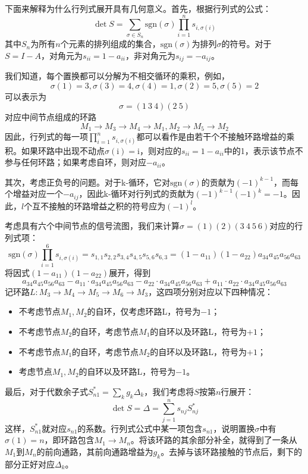 下面来解释为什么行列式展开具有几何意义。首先，根据行列式的公式：
\[\det S=\sum_{\sigma\in S_n}\text{sgn}(\sigma)\prod_{i=1}^{n}s_{i,\sigma(i)}\]
其中$S_n$为所有$n$个元素的排列组成的集合，$\text{sgn}(\sigma)$为排列$\sigma$的符号。对于$S=I-A$，对角元为$s_{ii}=1-a_{ii}$，非对角元为$s_{ij}=-a_{ij}$。

我们知道，每个置换都可以分解为不相交循环的乘积，例如，$$\sigma(1)=3,\sigma(3)=4,\sigma(4)=1,\sigma(2)=5,\sigma(5)=2$$
可以表示为
$$\sigma=(1\ 3\ 4)(2\ 5)$$
对应中间节点组成的环路
$$M_1\to M_3\to M_4\to M_1,M_2\to M_5\to M_2$$
因此，行列式的每一项$\prod_{i=1}^{n}s_{i,\sigma(i)}$都可以看作是由若干个不接触环路增益的乘积。如果环路中出现不动点$\sigma(\mathrm{i})=\mathrm{i}$，则对应的$s_{ii}=1-a_{ii}$中的1，表示该节点不参与任何环路；如果考虑自环，则对应$-a_{ii}$。

其次，考虑正负号的问题。对于k-循环，它对$\text{sgn}(\sigma)$的贡献为$(-1)^{k-1}$，而每个增益对应一个$-a_{ij}$，因此k-循环对行列式的贡献为$(-1)^{k-1}(-1)^k=-1$。因此，$l$个互不接触的环路增益之积的符号应为$(-1)^l$。
\begin{example}
    考虑具有六个中间节点的信号流图，我们来计算$\sigma=(1)(2)(3\ 4\ 5\ 6)$对应的行列式项：
    \[\text{sgn}(\sigma)\prod_{i=1}^{6}s_{i,\sigma(i)}=s_{1,1}s_{2,2}s_{3,4}s_{4,5}s_{5,6}s_{6,3}=(1-a_{11})(1-a_{22})a_{34}a_{45}a_{56}a_{63}\]
    将因式$(1-a_{11})(1-a_{22})$展开，得到
    \[a_{34}a_{45}a_{56}a_{63}-a_{11}\cdot a_{34}a_{45}a_{56}a_{63}-a_{22}\cdot a_{34}a_{45}a_{56}a_{63}+a_{11}\cdot a_{22}\cdot a_{34}a_{45}a_{56}a_{63}\]
    记环路$L:M_3\to M_4\to M_5\to M_6\to M_3$，这四项分别对应以下四种情况：\begin{itemize}
        \item 不考虑节点$M_1,M_2$的自环，仅考虑环路L，符号为$-1$；
        \item 不考虑节点$M_2$的自环，考虑节点$M_1$的自环以及环路L，符号为$+1$；
        \item 不考虑节点$M_1$的自环，考虑节点$M_2$的自环以及环路L，符号为$+1$；
        \item 考虑节点$M_1,M_2$的自环以及环路L，符号为$-1$。
    \end{itemize}
\end{example}

最后，对于代数余子式$S^*_{n1}=\sum_{k}g_k\Delta_k$，我们考虑将$S$按第$n$行展开：
\[\det S=\Delta=\sum_{j=1}^{n}s_{nj}S^*_{nj}\]
这样，$S^*_{n1}$就对应$s_{n1}$的系数。行列式公式中某一项包含$s_{n1}$，说明置换$\sigma$中有$\sigma(1)=n$，即环路包含$M_1\to M_n$。将该环路的其余部分补全，就得到了一条从$M_1$到$M_n$的前向通路，其前向通路增益为$g_k$。去掉与该环路接触的节点后，剩下的部分正好对应$\Delta_k$。


